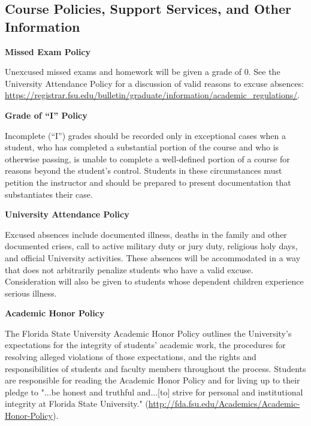 
\subsection*{Course Policies, Support Services, and Other Information}
\textbf{Missed Exam Policy}

Unexcused missed exams and homework will be given a grade of 0. See the University Attendance Policy for a discussion of valid reasons to excuse absences:
\url{https://registrar.fsu.edu/bulletin/graduate/information/academic_regulations/}.

\vspace{\baselineskip}

\textbf{Grade of “I” Policy}

Incomplete (“I”) grades should be recorded only in exceptional cases when a student, who has completed a substantial portion of the course and who is otherwise passing, is unable to complete a well-defined portion of a course for reasons beyond the student’s control. Students in these circumstances must petition the instructor and should be prepared to present documentation that substantiates their case.

\vspace{\baselineskip}

\textbf{University Attendance Policy}

Excused absences include documented illness, deaths in the family and other documented crises, call to active military duty or jury duty, religious holy days, and official University activities. These absences will be accommodated in a way that does not arbitrarily penalize students who have a valid excuse. Consideration will also be given to students whose dependent children experience serious illness.

\vspace{\baselineskip}

\textbf{Academic Honor Policy}

The Florida State University Academic Honor Policy outlines the University's expectations for the integrity of students' academic work, the procedures for resolving alleged violations of those expectations, and the rights and responsibilities of students and faculty members throughout the process. Students are responsible for reading the Academic Honor Policy and for living up to their pledge to "...be honest and truthful and...[to] strive for personal and institutional integrity at Florida State University." (\url{http://fda.fsu.edu/Academics/Academic-Honor-Policy}).

